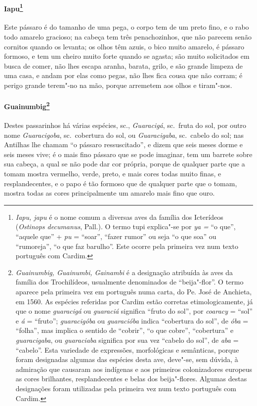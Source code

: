 \paragraph{Iapu\footnote{ \textit{Iapu, japu} é o nome comum a
diversas aves da família dos Icterídeos (\textit{Ostinops decumanus}, 
Pall.). O termo tupi explica"-se por \textit{ya =} ``o que'', ``aquele
que'' + \textit{pu} = ``soar'', ``fazer rumor'' ou seja ``o que soa'' ou
``rumoreja'', ``o que faz barulho''. Este ocorre pela primeira vez num
texto português com Cardim.}} Este pássaro é do tamanho de uma
pega, o corpo tem de um preto fino, e o rabo todo amarelo gracioso; na
cabeça tem três penachozinhos, que não parecem senão cornitos quando os
levanta; os olhos têm azuis, o bico muito amarelo, é pássaro formoso, e
tem um cheiro muito forte quando se agasta; são muito solicitados em
busca de comer, não lhes escapa aranha, barata, grilo, e são grande
limpeza de uma casa, e andam por elas como pegas, não lhes fica cousa
que não corram; é perigo grande terem"-no na mão, porque arremetem aos
olhos e tiram"-nos.

\paragraph{Guainumbig\footnote{ \textit{Guainumbig, Guainumbi,
Gainambi} é a designação atribuída às aves da família dos
Trochilídeos, usualmente denominados de ``beija"-flor''. O termo aparece
pela primeira vez em português numa carta, do Pe. José de
Anchieta, em 1560. As espécies referidas por Cardim estão corretas
etimologicamente, já que o nome \textit{guaracigá} ou \textit{guaraciá}
significa ``fruto do sol'', por \textit{coaracy} = ``sol'' e
\textit{á} = ``fruto''; \textit{guaracigóba} ou \textit{guaracióba}
indica ``cobertura do sol'', de \textit{óba} = ``folha'', mas
implica o sentido de ``cobrir'', ``o que cobre'', ``cobertura'' e
\textit{guaracigaba}, ou \textit{guaraciaba} significa por sua vez
``cabelo do sol'', de \textit{aba} = ``cabelo''. Esta variedade de
expressões, morfológicas e semânticas, porque foram designadas algumas
das espécies desta ave, deve"-se, sem dúvida, à admiração que causaram
aos indígenas e aos primeiros colonizadores europeus as cores
brilhantes, resplandecentes e belas dos beija"-flores. Algumas destas
designações foram utilizadas pela primeira vez num texto português com
Cardim.}} Destes passarinhos há várias espécies, sc.,
\textit{Guaracigá}, sc.~fruta do sol, por outro nome
\textit{Guaracigoba}, sc.~cobertura do sol, ou \textit{Guaracigaba}, 
sc.~cabelo do sol; nas Antilhas lhe chamam ``o pássaro ressuscitado'', e
dizem que seis meses dorme e seis meses vive; é o mais fino pássaro que
se pode imaginar, tem um barrete sobre sua cabeça, a qual se não pode
dar cor própria, porque de qualquer parte que a tomam mostra vermelho,
verde, preto, e mais cores todas muito finas, e resplandecentes, e o
papo é tão formoso que de qualquer parte que o tomam, mostra todas as
cores principalmente um amarelo mais fino que ouro.

